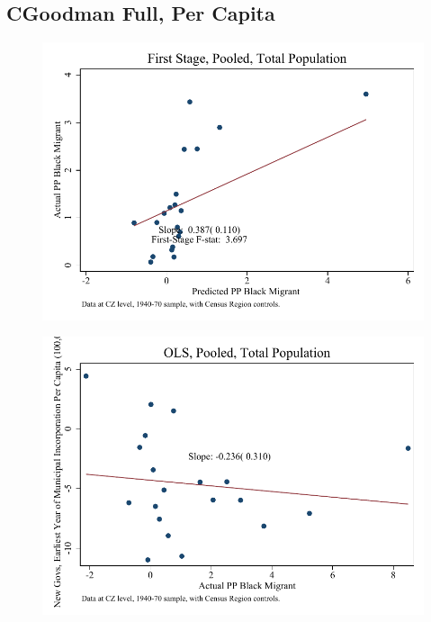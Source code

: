 \documentclass{article}
\begin{document}
\subsection{CGoodman Full, Per Capita}

\clearpage
\begin{figure}
\centering
\includegraphics{figures/simplefigs/pooled_cgoodman_pc_C3_total_fs.pdf}
\end{figure}
\clearpage
\begin{figure}
\centering
\includegraphics{figures/simplefigs/pooled_cgoodman_pc_C3_total_ols.pdf}
\end{figure}
\clearpage
\end{document}
